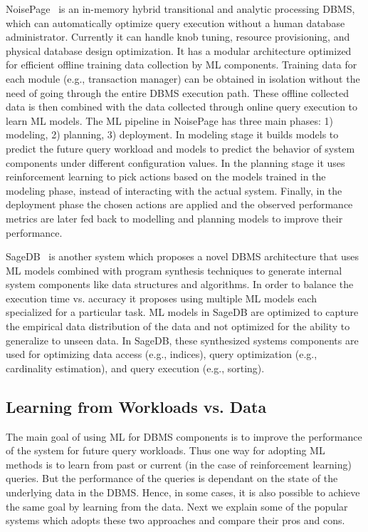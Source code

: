 NoisePage~\cite{noisepage} is an in-memory  hybrid transitional and analytic processing DBMS, which can automatically optimize query execution without a human database administrator.
Currently it can handle knob tuning, resource provisioning, and physical database design optimization.
It has a modular architecture optimized for efficient offline training data collection by ML components.
Training data for each module (e.g., transaction manager) can be obtained in isolation without the need of going through the entire DBMS execution path.
These offline collected data is then combined with the data collected through online query execution to learn ML models.
The ML pipeline in NoisePage has three main phases: 1) modeling, 2) planning, 3) deployment.
In modeling stage it builds models to predict the future query workload and models to predict the behavior of system components under different configuration values.
In the planning stage it uses reinforcement learning to pick actions based on the models trained in the modeling phase, instead of interacting with the actual system.
Finally, in the deployment phase the chosen actions are applied and the observed performance metrics are later fed back to modelling and planning models to improve their performance.

SageDB~\cite{sagedb} is another system which proposes a novel DBMS architecture that uses ML models combined with program synthesis techniques to generate internal system components like data structures and algorithms.
In order to balance the execution time vs. accuracy it proposes using multiple ML models each specialized for a particular task.
ML models in SageDB are optimized to capture the empirical data distribution of the data and not optimized for the ability to generalize to unseen data.
In SageDB, these synthesized systems components are  used for optimizing data access (e.g., indices), query optimization (e.g., cardinality estimation), and query execution (e.g., sorting).


\subsection{Learning from Workloads vs. Data} 
The main goal of using ML for DBMS components is to improve the performance of the system for future query workloads.
Thus one way for adopting ML methods is to learn from past or current (in the case of reinforcement learning) queries.
But the performance of the queries is dependant on the state of the underlying data in the DBMS.
Hence, in some cases, it is also possible to achieve the same goal by learning from the data.
Next we explain some of the popular systems which adopts these two approaches and compare their pros and cons.

